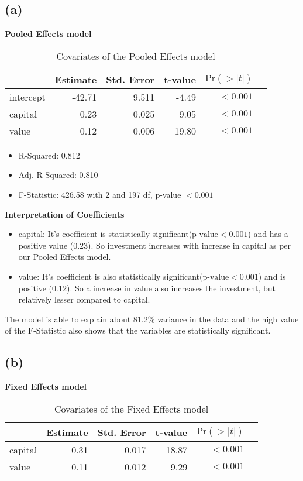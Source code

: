 \documentclass[a4paper]{article}
\begin{document}
\subsection*{(a)}
\textbf{Pooled Effects model}
\begin{table}[ht]
    \centering
    \begin{tabular}{@{}lrrrrr@{}}
        \toprule
                & Estimate  & Std. Error  & t-value & \(\text{Pr}(>|t|)\)\\
                \midrule
        intercept & -42.71 & 9.511 & -4.49 & \(<0.001\)\\
        capital   & 0.23   & 0.025 & 9.05  & \(<0.001\)\\
        value     & 0.12   & 0.006 & 19.80 & \(<0.001\)\\
        \bottomrule
    \end{tabular}
    \caption{Covariates of the Pooled Effects model}
\end{table}
\begin{itemize}
    \item R-Squared: 0.812
    \item Adj. R-Squared: 0.810
    \item F-Statistic: 426.58 with 2 and 197 df, p-value \(<0.001\) 
\end{itemize}

\textbf{Interpretation of Coefficients}
\begin{itemize}
    \item capital: It's coefficient is statistically significant(\(\text{p-value}<0.001\)) and has a positive value (0.23). So investment increases with increase in capital as per our Pooled Effects model.
    \item value: It's coefficient is also statistically significant(\(\text{p-value}<0.001\)) and is positive (0.12). So a increase in value also increases the investment, but relatively lesser compared to capital. 
\end{itemize}

The model is able to explain about \(81.2\%\) variance in the data and the high value of the F-Statistic also shows that the variables are statistically significant.

\newpage
\subsection*{(b)}
\textbf{Fixed Effects model}
\begin{table}[ht]
    \centering
    \begin{tabular}{@{}lrrrrr@{}}
        \toprule
                & Estimate  & Std. Error  & t-value & \(\text{Pr}(>|t|)\)\\
                \midrule
        capital   & 0.31   & 0.017 & 18.87  & \(<0.001\)\\
        value     & 0.11   & 0.012 & 9.29 & \(<0.001\)\\
        \bottomrule
    \end{tabular}
    \caption{Covariates of the Fixed Effects model}
\end{table}
\end{document}
